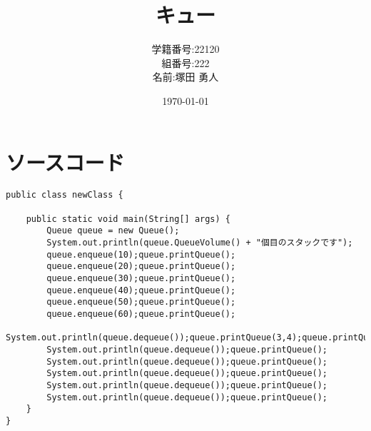 \documentclass[a4j]{jarticle}
\begin{document}
\title{キュー}
\author{学籍番号:22120 \\ 組番号:222 \\名前:塚田 勇人}
\date{\today}
\maketitle
\newpage

\section{ソースコード}
\begin{lstlisting}[caption=main class,label=Queue.java]
  public class newClass {

	public static void main(String[] args) {
		Queue queue = new Queue();
		System.out.println(queue.QueueVolume() + "個目のスタックです");
		queue.enqueue(10);queue.printQueue();
		queue.enqueue(20);queue.printQueue();
		queue.enqueue(30);queue.printQueue();
		queue.enqueue(40);queue.printQueue();
		queue.enqueue(50);queue.printQueue();
		queue.enqueue(60);queue.printQueue();
		System.out.println(queue.dequeue());queue.printQueue(3,4);queue.printQueue();
		System.out.println(queue.dequeue());queue.printQueue();
		System.out.println(queue.dequeue());queue.printQueue();
		System.out.println(queue.dequeue());queue.printQueue();
		System.out.println(queue.dequeue());queue.printQueue();
		System.out.println(queue.dequeue());queue.printQueue();
	}
}
\end{lstlisting}
\end{document}
